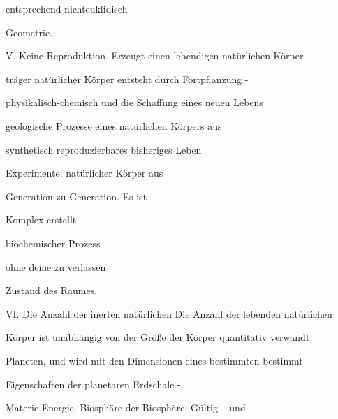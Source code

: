 \documentclass[11pt,a4paper]{book}
\begin{document}
                                   entsprechend nichteuklidisch



                                   Geometrie.



 



V. Keine Reproduktion. Erzeugt einen lebendigen natürlichen Körper



träger natürlicher Körper entsteht durch Fortpflanzung -



physikalisch-chemisch und die Schaffung eines neuen Lebens



geologische Prozesse eines natürlichen Körpers aus



synthetisch reproduzierbares bisheriges Leben



Experimente. natürlicher Körper aus



                                   Generation zu Generation. Es ist



                                   Komplex erstellt



                                   biochemischer Prozess



                                   ohne deine zu verlassen



                                   Zustand des Raumes.



 



VI. Die Anzahl der inerten natürlichen Die Anzahl der lebenden natürlichen



Körper ist unabhängig von der Größe der Körper quantitativ verwandt



Planeten, und wird mit den Dimensionen eines bestimmten bestimmt



Eigenschaften der planetaren Erdschale -



Materie-Energie. Biosphäre der Biosphäre. Gültig -- und
\end{document}
